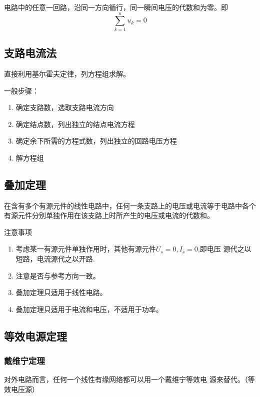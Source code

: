 \documentclass[12pt, a4paper, oneside]{ctexart}%
\begin{document}
电路中的任意一回路，沿同一方向循行，同一瞬间电压的代数和为零。即
\[
    \sum_{k=1}^n u_k=0
\]


\subsection{支路电流法}

直接利用基尔霍夫定律，列方程组求解。

\noindent 一般步骤：
\begin{enumerate}
    \item 确定支路数，选取支路电流方向
    \item 确定结点数，列出独立的结点电流方程
    \item 确定余下所需的方程式数，列出独立的回路电压方程
    \item 解方程组
\end{enumerate}

\subsection{叠加定理}

在含有多个有源元件的线性电路中，任何一条支路上的电压或电流等于电路中各个
有源元件分别单独作用在该支路上时所产生的电压或电流的代数和。

\large{注意事项}

\normalsize
\begin{enumerate}
    \item 考虑某一有源元件单独作用时，其他有源元件$U_s=0,I_s=0$,即电压
    源代之以短路，电流源代之以开路.
    \item 注意是否与参考方向一致。
    \item 叠加定理只适用于线性电路。
    \item 叠加定理只适用于电流和电压，不适用于功率。
\end{enumerate}

\subsection{等效电源定理}

\subsubsection{戴维宁定理}

对外电路而言，任何一个线性有缘网络都可以用一个戴维宁等效电
源来替代。（等效电压源）
\end{document}
